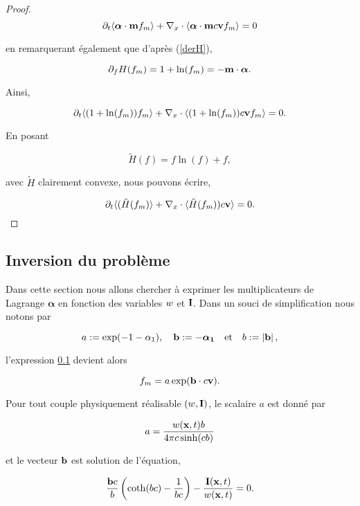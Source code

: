 \begin{proof}
  $$ 
    \partial_t \langle \bm{\alpha}\cdot\mathbf{m} f_m \rangle + 
    \nabla_x \cdot \langle \bm\alpha \cdot \mathbf{m} c \mathbf{v}  f_m \rangle = 0
  $$

  en remarquerant également que d'après (\ref{derH}), 

  $$
    \partial_{f} H(f_m) = 1 + \ln(f_m) = - \mathbf{m} \cdot \bm{\alpha}.
  $$

  Ainsi,

  $$ 
    \partial_t \langle (1 + \ln(f_m)) f_m \rangle + 
    \nabla_x \cdot \langle ( 1 + \ln(f_m)) c \mathbf{v}  f_m \rangle = 0.
  $$

  En posant
  
  $$
    \tilde{H}(f) = f \ln(f) + f,
  $$
  
  avec $\tilde{H}$ clairement convexe, nous pouvons écrire,
  
  $$ 
    \partial_t \langle (\tilde{H}(f_m) \rangle + 
    \nabla_x \cdot \langle \tilde{H}(f_m)) c \mathbf{v}   \rangle = 0.
  $$

\end{proof}


\subsection{Inversion du problème}

Dans cette section nous allons chercher à exprimer les multiplicateurs de 
Lagrange $\bm{\alpha}$ en fonction des variables $w$ et $\mathbf{I}$. Dans un souci de simplification nous notons par

$$
  a := \exp(-1-\alpha_1), \quad \mathbf{b} := -\bm{\alpha_1}
  \quad \mbox{et} \quad b:=\left\lvert\mathbf{b}\right\rvert,
$$

l'expression \ref{} devient alors

\begin{equation}
  f_m = a\exp(\mathbf{b}\cdot c\mathbf{v}).
\end{equation}

\begin{proposition}
  Pour tout couple physiquement réalisable $(w,\mathbf{I})$, le scalaire $a$ est 
  donné par

  \begin{equation}
    a = \frac{w(\mathbf{x},t) b}{4 \pi c \sinh(cb)}
  \end{equation}

  et le vecteur $\mathbf{b}$ est solution de l'équation,

  \begin{equation}
    \frac{\mathbf{b} c}{b} \left( \coth(bc)  - \frac{1}{bc} \right) 
    - \frac{\mathbf{I}(\mathbf{x},t)}{w(\mathbf{x},t)} = 0.
  \end{equation}

\end{proposition}

